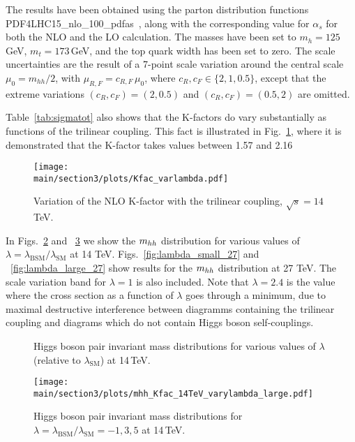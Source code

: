 The results have been obtained using the parton distribution functions PDF4LHC15\_nlo\_100\_pdfas~\cite{Butterworth:2015oua,CT14,MMHT14,Ball:2014uwa},
along with the corresponding value for $\alpha_s$ for both the NLO and
the LO calculation.
The masses have been set to $m_h=125$\,GeV, $m_t=173$\,GeV,
and the top quark width has been set to zero. 
The scale uncertainties are the result of a 7-point scale variation around the central scale $\mu_0 = m_{hh}/2$,
with $\mu_{R,F}=c_{R,F}\,\mu_0$, where 
$c_R,c_F\in \{2,1,0.5\}$, except that the extreme variations $(c_R,c_F)=(2,0.5)$ and $(c_R,c_F)=(0.5,2)$
are omitted. 

Table~\ref{tab:sigmatot} also shows that the K-factors do vary substantially as functions of the trilinear coupling.
This fact is illustrated in Fig.~\ref{fig:Kfacvariation}, where it is demonstrated that the K-factor takes values between 1.57 and 2.16

\begin{figure}[htb]
  \centering
    \texttt{[image: \\main/section3/plots/Kfac\_varlambda.pdf]}
\caption{Variation of the NLO K-factor with the trilinear coupling, $\sqrt{s}=14$\,TeV.}
\label{fig:Kfacvariation}
\end{figure}



In Figs.~\ref{fig:lambda_small} and ~\ref{fig:lambda_large} we show the $m_{hh}$ distribution for various values of $\lambda=\lambda_{\mathrm{BSM}}/\lambda_{\mathrm{SM}}$ at 14 TeV.
Figs.~\ref{fig:lambda_small_27} and ~\ref{fig:lambda_large_27} 
 show results for the $m_{hh}$ distribution at 27 TeV. The scale variation band for $\lambda=1$ is also included.
 Note that $\lambda=2.4$ is the value where the cross section as a function of $\lambda$ goes through a minimum, due to maximal destructive interference between diagramms containing the trilinear coupling and diagrams which do not contain Higgs boson self-couplings.
 
\begin{figure}[htb]
  \centering
 \caption{Higgs boson pair invariant mass distributions for various values of $\lambda$ (relative to $\lambda_{\mathrm{SM}}$)  at 14\,TeV.}
\label{fig:lambda_small}
\end{figure}
%
\begin{figure}[htb]
  \centering
    \texttt{[image: \\main/section3/plots/mhh\_Kfac\_14TeV\_varylambda\_large.pdf]}
\caption{Higgs boson pair invariant mass distributions for $\lambda=\lambda_{\mathrm{BSM}}/\lambda_{\mathrm{SM}}=-1,3,5$  at 14\,TeV.}
\label{fig:lambda_large}
\end{figure}

